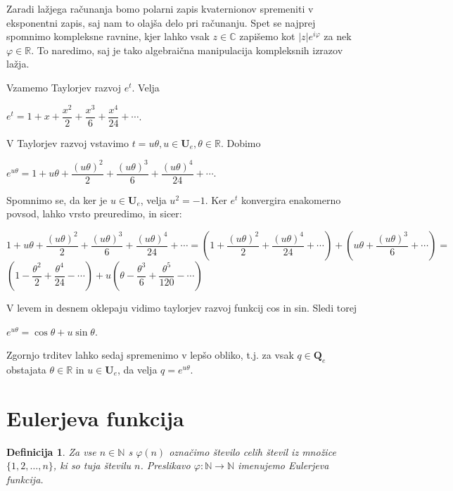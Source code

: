 \documentclass[a4paper,12pt]{article}
\def\N{\mathbb{N}} %
\def\R{\mathbb{R}} %
\def\C{\mathbb{C}} %
\def\Qe{\textbf{Q}_{e}} %
\def\Ue{\textbf{U}_{e}} %
\newtheorem{definicija}{Definicija}
\begin{document}
Zaradi lažjega računanja bomo polarni zapis kvaternionov spremeniti v eksponentni zapis,
saj nam to olajša delo pri računanju. Spet se najprej spomnimo kompleksne ravnine, kjer lahko
vsak $z \in \C$ zapišemo kot $|z|e^{i\varphi}$ za nek $\varphi \in \R$. To naredimo, saj je tako
algebraična manipulacija kompleksnih izrazov lažja.

Vzamemo Taylorjev razvoj $e^t$. Velja
\begin{center}
   $e^t = 1+x+\dfrac{x^2}{2}+\dfrac{x^3}{6}+\dfrac{x^4}{24} + \cdots$.
\end{center}
V Taylorjev razvoj vstavimo $t = u\theta, u \in \Ue, \theta \in \R$. Dobimo %
\begin{center}
   $e^{u\theta} = 1 + u\theta + \dfrac{(u\theta)^2}{2} + \dfrac{(u\theta)^3}{6} + \dfrac{(u\theta)^4}{24} + \cdots$.
\end{center}
Spomnimo se, da ker je $u \in \Ue$, velja $u^2=-1$. Ker $e^t$ konvergira enakomerno povsod, lahko vrsto preuredimo, in sicer:
\begin{center}
   $1 + u\theta + \dfrac{(u\theta)^2}{2} + \dfrac{(u\theta)^3}{6} + \dfrac{(u\theta)^4}{24} + \cdots = (1 + \dfrac{(u\theta)^2}{2} + \dfrac{(u\theta)^4}{24}+ \cdots) + (u\theta + \dfrac{(u\theta)^3}{6} + \cdots) = $
   $(1-\dfrac{\theta^2}{2}+\dfrac{\theta^4}{24}- \cdots) + u(\theta - \dfrac{\theta^3}{6} +\dfrac{\theta^5}{120} - \cdots)$
\end{center}
V levem in desnem oklepaju vidimo taylorjev razvoj funkcij cos in sin. Sledi torej
\begin{center}
   $e^{u\theta} = \cos\theta  + u\sin\theta$.
\end{center}
Zgornjo trditev lahko sedaj spremenimo v lepšo obliko, t.j. za vsak $q \in \Qe$ obstajata
$\theta \in \R$ in $u \in \Ue$, da velja $q =  e^{u\theta}$.
\section{Eulerjeva funkcija}


\begin{definicija}
Za vse $n \in \N$ s $\varphi(n)$ označimo število 
celih števil iz množice $\{1, 2, \ldots, n\}$, ki so tuja številu $n$.
Preslikavo $\varphi: \N \to \N$ imenujemo \em{Eulerjeva funkcija}.
\end{definicija}
\end{document}
